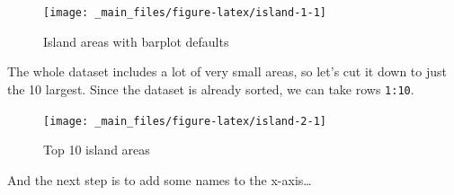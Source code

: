 \documentclass[
  11pt,
  a4paper,
]{book}
\newenvironment{Shaded}{\begin{snugshade}}{\end{snugshade}}
\newcommand{\AttributeTok}[1]{\textcolor[rgb]{0.77,0.63,0.00}{#1}}
\newcommand{\CommentTok}[1]{\textcolor[rgb]{0.56,0.35,0.01}{\textit{#1}}}
\newcommand{\DecValTok}[1]{\textcolor[rgb]{0.00,0.00,0.81}{#1}}
\newcommand{\FunctionTok}[1]{\textcolor[rgb]{0.00,0.00,0.00}{#1}}
\newcommand{\NormalTok}[1]{#1}
\newcommand{\SpecialCharTok}[1]{\textcolor[rgb]{0.00,0.00,0.00}{#1}}
\begin{document}
\begin{Shaded}
\end{Shaded}

\begin{figure}

{\centering \texttt{[image: \_main\_files/figure-latex/island-1-1]} 

}

\caption{Island areas with barplot defaults}\label{fig:island-1}
\end{figure}

The whole dataset includes a lot of very small areas, so let's cut it down to just the 10 largest. Since the dataset is already sorted, we can take rows \texttt{1:10}.

\begin{Shaded}
\end{Shaded}

\begin{figure}

{\centering \texttt{[image: \_main\_files/figure-latex/island-2-1]} 

}

\caption{Top 10 island areas}\label{fig:island-2}
\end{figure}

And the next step is to add some names to the x-axis\ldots{}

\begin{Shaded}
\end{Shaded}
\end{document}
